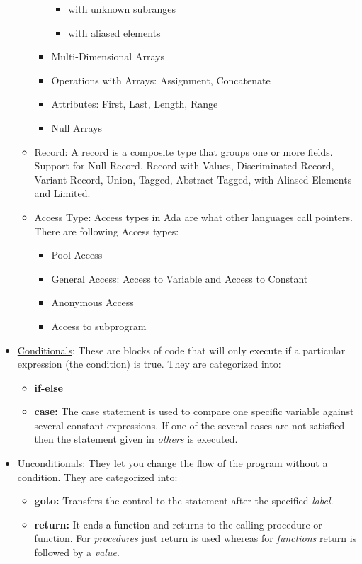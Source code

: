 \documentclass{article}
\begin{document}
\begin{itemize}
\begin{itemize}
\begin{itemize}
\begin{itemize}
				\item with unknown subranges
				\item with aliased elements
			\end{itemize}
		\item Multi-Dimensional Arrays
		\item Operations with Arrays: Assignment, Concatenate
		\item Attributes: First, Last, Length, Range
		\item Null Arrays		
		\end{itemize}
		\item Record: A record is a composite type that groups one or more fields. \\
		Support for Null Record, Record with Values, Discriminated Record, Variant Record, Union, Tagged, Abstract Tagged, with Aliased Elements and Limited.
		\item Access Type: Access types in Ada are what other languages call pointers. There are following Access types:
			\begin{itemize}
				\item Pool Access
				\item General Access: Access to Variable and Access to Constant
				\item Anonymous Access
				\item Access to subprogram
			\end{itemize}
	\end{itemize}
	\item \uline{Conditionals}: These are blocks of code that will only execute if a particular expression (the condition) is true. They are categorized into:
	\begin{itemize}
		\item \textbf{if-else}
		\item \textbf{case:} The case statement is used to compare one specific variable against several constant expressions. If one of the several cases are not satisfied then the statement given in \emph{others} is executed.		
	\end{itemize}	
	\item \uline{Unconditionals}: They let you change the flow of the program without a condition. They are categorized into:
		\begin{itemize}
			\item \textbf{goto:} Transfers the control to the statement after the specified \emph{label}.
			\item \textbf{return:} It ends a function and returns to the calling procedure or function. For \emph{procedures} just return is used whereas for \emph{functions} return is followed by a \emph{value}.

\end{itemize}
\end{itemize}
\end{document}
